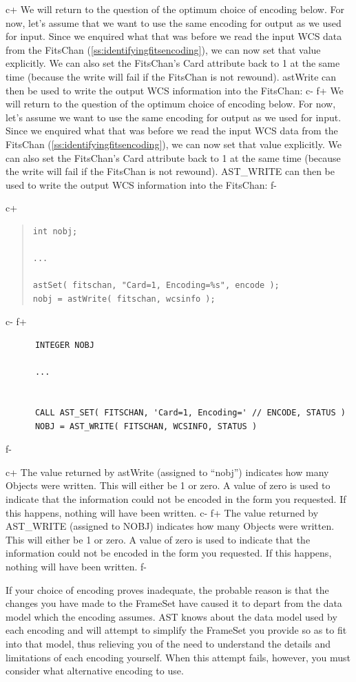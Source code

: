 \documentclass[twoside,11pt]{article}
\newcommand{\secref}[1]{\S\ref{#1}}
\renewcommand{\secref}[1]{\ref{#1}}
\begin{document}
c+
We will return to the question of the optimum choice of encoding
below.  For now, let's assume that we want to use the same encoding
for output as we used for input. Since we enquired what that was
before we read the input WCS data from the FitsChan
(\secref{ss:identifyingfitsencoding}), we can now set that value
explicitly. We can also set the FitsChan's Card attribute back to 1 at
the same time (because the write will fail if the FitsChan is not
rewound). astWrite can then be used to write the output WCS
information into the FitsChan:
c-
f+
We will return to the question of the optimum choice of encoding
below.  For now, let's assume we want to use the same encoding for
output as we used for input. Since we enquired what that was before we
read the input WCS data from the FitsChan
(\secref{ss:identifyingfitsencoding}), we can now set that value
explicitly. We can also set the FitsChan's Card attribute back to 1 at
the same time (because the write will fail if the FitsChan is not
rewound). AST\_WRITE can then be used to write the output WCS
information into the FitsChan:
f-

c+
\begin{quote}
\small
\begin{verbatim}
int nobj;

...

astSet( fitschan, "Card=1, Encoding=%s", encode );
nobj = astWrite( fitschan, wcsinfo );
\end{verbatim}
\normalsize
\end{quote}
c-
f+
\small
\begin{verbatim}
      INTEGER NOBJ

      ...


      CALL AST_SET( FITSCHAN, 'Card=1, Encoding=' // ENCODE, STATUS )
      NOBJ = AST_WRITE( FITSCHAN, WCSINFO, STATUS )
\end{verbatim}
\normalsize
f-

c+
The value returned by astWrite (assigned to ``nobj'') indicates how
many Objects were written. This will either be 1 or zero. A value of
zero is used to indicate that the information could not be encoded in
the form you requested. If this happens, nothing will have been
written.
c-
f+
The value returned by AST\_WRITE (assigned to NOBJ) indicates how many
Objects were written. This will either be 1 or zero. A value of zero
is used to indicate that the information could not be encoded in the
form you requested. If this happens, nothing will have been written.
f-

If your choice of encoding proves inadequate, the probable reason is
that the changes you have made to the FrameSet have caused it to
depart from the data model which the encoding assumes.  AST knows
about the data model used by each encoding and will attempt to
simplify the FrameSet you provide so as to fit into that model, thus
relieving you of the need to understand the details and limitations of
each encoding yourself. When this attempt fails, however, you must
consider what alternative encoding to use.
\end{document}
